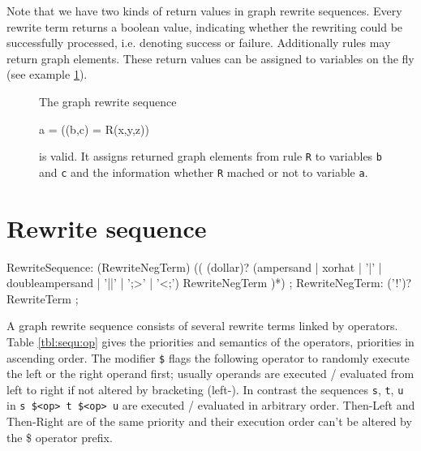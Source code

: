 Note that we have two kinds of return values in graph rewrite sequences.
Every rewrite term returns a boolean value, indicating whether the rewriting could be successfully processed, i.e. denoting success or failure.
Additionally rules may return graph elements.
These return values can be assigned to variables on the fly (see example \ref{ex:grsreturn}).
\begin{figure}[htbp]
\begin{example}
	\label{ex:grsreturn}
	The graph rewrite sequence
	\begin{grgen}	 
a = ((b,c) = R(x,y,z))
	\end{grgen}
	is valid. 
	It assigns returned graph elements from rule \texttt{R} to variables \texttt{b} and \texttt{c} and the information whether \texttt{R} mached or not to variable \texttt{a}.
\end{example}
\end{figure}

\section{Rewrite sequence}

\makeatletter

\begin{rail}
  RewriteSequence: 
    (RewriteNegTerm) (( (dollar)? (ampersand | xorhat | '|' | doubleampersand | '||' | ';>' | '<;') RewriteNegTerm )*)
	;
  RewriteNegTerm: 
    ('!')? RewriteTerm
	;
\end{rail}

A graph rewrite sequence consists of several rewrite terms linked by operators.
Table \ref{tbl:sequ:op} gives the priorities and semantics of the operators, priorities in ascending order.
The modifier \texttt{\$} flags the following operator to randomly execute the left or the right operand first; usually operands are executed / evaluated from left to right if not altered by bracketing (left-). 
In contrast the sequences \texttt{s}, \texttt{t}, \texttt{u} in \texttt{s \$<op> t \$<op> u} are executed / evaluated in arbitrary order.
Then-Left and Then-Right are of the same priority and their execution order can't be altered by the \$ operator prefix.

